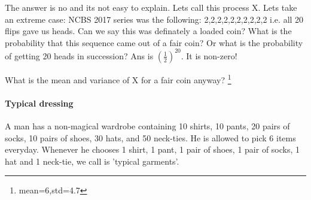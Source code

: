 \documentclass[a4paper,9pt, addpoints, solutions]{exam}
\begin{document}
\begin{questions}
\begin{solution}
The answer is no and its not easy to explain.
Lets call this process X. Lets take an extreme case: NCBS 2017 series was the
following: 2,2,2,2,2,2,2,2,2,2 i.e. all 20 flips gave us heads. Can we say this
was definately a loaded coin? What is the probability that this sequence came
out of a fair coin? Or what is the probability of getting 20 heads in
succession? Ans is $(\frac{1}{2})^{20}$. It is non-zero!

What is the mean and variance of X for a fair coin anyway?  \footnote{mean=6,std=4.7}
\end{solution} 

\paragraph{Typical dressing}

\question[5]
A man has a non-magical wardrobe containing 10 shirts, 10 pants, 20 pairs of
socks, 10 pairs of shoes, 30 hats, and 50 neck-ties.  He is allowed to pick 6
items everyday. Whenever he chooses 1 shirt, 1 pant, 1 pair of
shoes, 1 pair of socks, 1 hat and 1 neck-tie, we call is 'typical garments'.

\end{questions}
\end{document}
